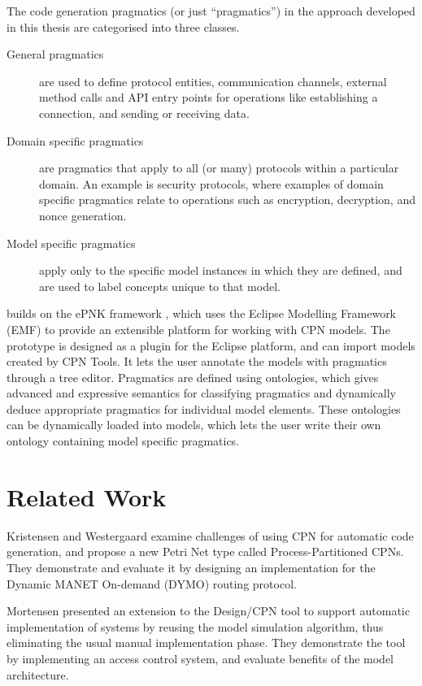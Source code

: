 The code generation pragmatics (or just ``pragmatics'') in the approach
developed in this thesis are categorised into three classes.
\begin{description}
	\item[General pragmatics] are used to define protocol entities, communication
	channels, external method calls and API entry points for operations like
	establishing a connection, and sending or receiving data.
	\item[Domain specific pragmatics] are pragmatics that apply to all (or many)
	protocols within a particular domain. An example is security protocols, where
	examples of domain specific pragmatics relate to operations such as
	encryption, decryption, and nonce generation.
	\item[Model specific pragmatics] apply only to the specific model instances in
	which they are defined, and are used to label concepts unique to that model. 
\end{description}

\thename{} builds on the ePNK framework \cite{kindler2011epnk}, which uses the
Eclipse Modelling Framework (EMF) to provide an extensible platform for working
with CPN models. The prototype is designed as a plugin for the Eclipse platform,
and can import models created by CPN Tools. It lets the user annotate the models
with pragmatics through a tree editor. Pragmatics are defined using ontologies,
which gives advanced and expressive semantics for classifying pragmatics and
dynamically deduce appropriate pragmatics for individual model elements. These
ontologies can be dynamically loaded into models, which lets the user write
their own ontology containing model specific pragmatics.

\section{Related Work}

Kristensen and Westergaard \cite{kristensen2010automatic} examine challenges of
using CPN for automatic code generation, and propose a new Petri Net type called
Process-Partitioned CPNs. They demonstrate and evaluate it by
designing an implementation for the Dynamic MANET On-demand (DYMO) routing
protocol.

Mortensen \cite{mortensen2000automatic} presented an extension to the Design/CPN
tool to support automatic implementation of systems by reusing the model
simulation algorithm, thus eliminating the usual manual implementation phase.
They demonstrate the tool by implementing an access control system, and
evaluate benefits of the model architecture.

